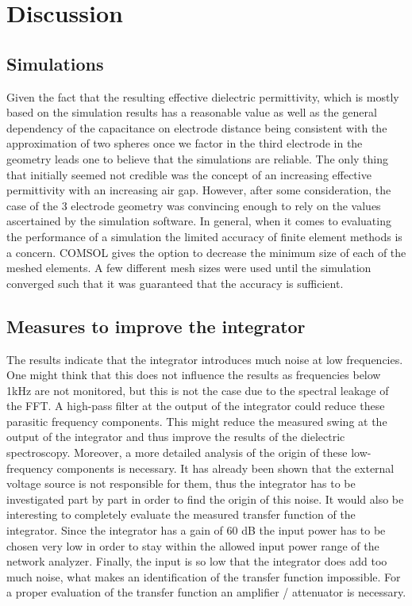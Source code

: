 \chapter{Discussion}

\section{Simulations}
Given the fact that the resulting effective dielectric permittivity, which
is mostly based on the simulation results has 
a reasonable value as well as the general dependency of the capacitance on electrode distance being consistent
with the approximation of two spheres once we factor in the third electrode in the geometry leads one 
to believe that the simulations are reliable. 
\newline
The only thing that initially seemed not credible was the concept of an increasing effective permittivity
with an increasing air gap. However, after some consideration, the case of the 3 electrode geometry was convincing enough to rely
on the values ascertained by the simulation software. 
\newline
In general, when it comes to evaluating the performance of a simulation the limited accuracy
of finite element methods is a concern. COMSOL gives the option to decrease the minimum size of each of the meshed elements.
A few different mesh sizes were used until the simulation converged such that it was guaranteed that the accuracy is sufficient. 

\section{Measures to improve the integrator}
The results indicate that the integrator introduces much noise at low frequencies. One might think that this does not influence the results as frequencies below 1kHz are not monitored, but this is not the case due to the spectral leakage of the FFT.  A high-pass filter at the output of the integrator could reduce these parasitic frequency components. This might reduce the measured swing at the output of the integrator and thus improve the results of the dielectric spectroscopy. 
Moreover, a more detailed analysis of the origin of these low-frequency components is necessary. It has already been shown that the external voltage source is not responsible for them, thus the integrator has to be investigated part by part in order to find the origin of this noise. 
It would also be interesting to completely evaluate the measured transfer function of the integrator. Since the integrator has a gain of 60 dB the input power has to be chosen very low in order to stay within the allowed input power range of the network analyzer. Finally, the input is so low that the integrator does add too much noise, what makes an identification of the transfer function impossible. For a proper evaluation of the transfer function an amplifier / attenuator is necessary. 

